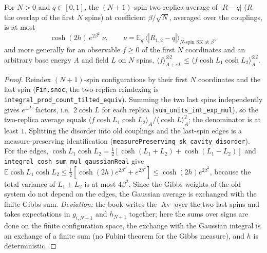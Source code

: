 \begin{lemma}
\label{lem:sg-tal:pair-perturb-cavity}
  \leanok
{}
For $N>0$ and $q\in[0,1]$, the $(N+1)$-spin two-replica average of $|R-q|$ ($R$ the overlap of the first
$N$ spins) at coefficient $\beta/\sqrt N$, averaged over the couplings, is at most
\[
 \cosh(2h)\,e^{2\beta^2}\;\nu,\qquad \nu=\mathbb E_{g'}\bigl\langle|R_{1,2}-q|\bigr\rangle_{\text{$N$-spin SK at }\beta},
\]
and more generally for an observable $f\ge0$ of the first $N$ coordinates and an arbitrary base energy
$A$ and field $L$ on $N$ spins,
$\langle f\rangle_{A+\varepsilon L}^{\otimes2}\le\langle f\cosh L_1\cosh L_2\rangle_A^{\otimes2}$.
\end{lemma}
\begin{proof}
  \leanok
Reindex $(N+1)$-spin configurations by their first $N$ coordinates and the last spin
(\texttt{Fin.snoc}; the two-replica reindexing is \texttt{integral\_prod\_count\_tilted\_equiv}).
Summing the two last spins independently gives $e^{\pm L}$ factors, i.e.\ $2\cosh L$ for each replica
(\texttt{sum\_units\_int\_exp\_mul}), so the two-replica average equals
$\langle f\cosh L_1\cosh L_2\rangle_A/\langle\cosh L\rangle_A^2$; the denominator is at least $1$.
Splitting the disorder into old couplings and the last-spin edges is a measure-preserving
identification (\texttt{measurePreserving\_sk\_cavity\_disorder}).  For the edges, $\cosh L_1\cosh L_2=
\tfrac12[\cosh(L_1+L_2)+\cosh(L_1-L_2)]$ and \texttt{integral\_cosh\_sum\_mul\_gaussianReal} give
$\mathbb E\cosh L_1\cosh L_2\le\tfrac12[\cosh(2h)e^{2\beta^2}+e^{2\beta^2}]\le\cosh(2h)e^{2\beta^2}$,
because the total variance of $L_1\pm L_2$ is at most $4\beta^2$.  Since the Gibbs weights of the old system
do not depend on the edges, the Gaussian average is exchanged with the finite Gibbs sum.
\emph{Deviation:} the book writes the $\operatorname{Av}$ over the two last spins and takes
expectations in $g_{i,N+1}$ and $h_{N+1}$ together; here the sums over signs are done on the finite
configuration space, the exchange with the Gaussian integral is an exchange of a finite sum (no Fubini
theorem for the Gibbs measure), and $h$ is deterministic.
\end{proof}

